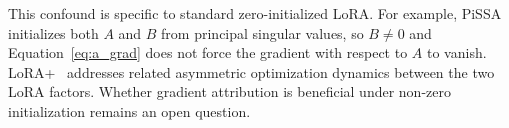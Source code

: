 This confound is specific to standard zero-initialized LoRA. For example,
PiSSA~\citep{meng2024pissa} initializes both $A$ and $B$ from principal
singular values, so $B \neq 0$ and Equation~\ref{eq:a_grad} does not
force the gradient with respect to $A$ to vanish. LoRA+~\citep{hayou2024loraplus}
addresses related asymmetric optimization dynamics between the two LoRA
factors. Whether gradient attribution is beneficial under non-zero
initialization remains an open question.





